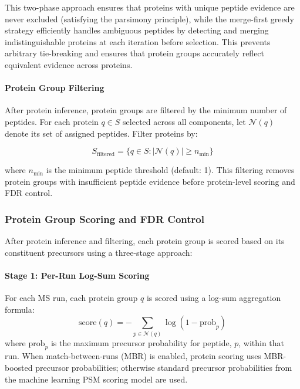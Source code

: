 \documentclass{article}
\begin{document}
This two-phase approach ensures that proteins with unique peptide evidence are never excluded (satisfying the parsimony principle), while the merge-first greedy strategy efficiently handles ambiguous peptides by detecting and merging indistinguishable proteins at each iteration before selection. This prevents arbitrary tie-breaking and ensures that protein groups accurately reflect equivalent evidence across proteins.

\paragraph{Protein Group Filtering} After protein inference, protein groups are filtered by the minimum number of peptides. For each protein $q \in S$ selected across all components, let $\mathcal{N}(q)$ denote its set of assigned peptides. Filter proteins by:

\begin{equation}
S_{\text{filtered}} = \{q \in S : |\mathcal{N}(q)| \geq n_{\text{min}}\}
\end{equation}

where $n_{\text{min}}$ is the minimum peptide threshold (default: 1). This filtering removes protein groups with insufficient peptide evidence before protein-level scoring and FDR control.

\subsubsection{Protein Group Scoring and FDR Control}

After protein inference and filtering, each protein group is scored based on its constituent precursors using a three-stage approach:

\paragraph{Stage 1: Per-Run Log-Sum Scoring} For each MS run, each protein group $q$ is scored using a log-sum aggregation formula:
\begin{equation}
\text{score}(q) = -\sum_{p \in \mathcal{N}(q)} \log(1 - \text{prob}_p)
\end{equation}
where $\text{prob}_p$ is the maximum precursor probability for peptide, $p$, within that run. When match-between-runs (MBR) is enabled, protein scoring uses MBR-boosted precursor probabilities; otherwise standard precursor probabilities from the machine learning PSM scoring model are used.
\end{document}
